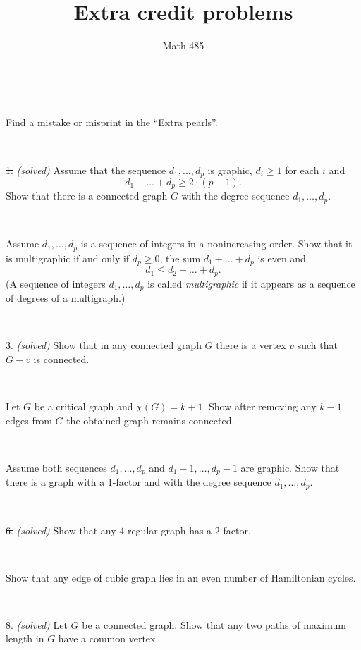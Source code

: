 \documentclass[oneside,a4paper]{article}
\begin{document}
%
\title{Extra credit problems}
\author{Math 485}
\date{}
\maketitle

\textit{}

\ 

 Find a mistake or misprint in the ``Extra pearls''.


\ 

\noindent \sout{1.} \textit{(solved)}
Assume that the sequence $d_1,\dots, d_p$ is graphic,
$d_i\ge 1$ for each $i$ and 
\[d_1+\dots+d_p\ge 2\cdot(p-1).\]
Show that there is a connected graph $G$ with the degree sequence $d_1,\dots, d_p$.

\ 

Assume $d_1,\dots, d_p$ is a sequence of integers in a nonincreasing order.
Show that it is multigraphic if and only if $d_p\ge0$, the sum $d_1+\dots+ d_p$ is even and 
\[d_1\le d_2+\dots+d_p.\]
(A sequence of integers $d_1,\dots, d_p$ is called \textit{multigraphic} if it appears as a sequence of degrees of a multigraph.)

\ 

\noindent \sout{3.} \textit{(solved)} 
Show that in any connected graph $G$ there is a vertex $v$ such that $G-v$ is connected.

\ 

Let $G$ be a critical graph and $\chi(G)=k+1$.
Show after removing any $k-1$ edges from $G$  
the obtained graph remains connected. 

\ 

Assume both sequences $d_1,\dots, d_p$
 and $d_1-1,\dots, d_p-1$ are graphic.
Show that there is a graph with a 1-factor and with the degree sequence $d_1,\dots, d_p$.

\ 

\noindent \sout{6.} \textit{(solved)} %
Show that any $4$-regular graph has a $2$-factor.

\ 

Show that any edge of cubic graph lies in an even number of Hamiltonian cycles.

\ 

\noindent \sout{8.} \textit{(solved)} 
Let $G$ be a  connected graph.
Show that any two paths of maximum length in $G$ have a common vertex.
\end{document}
